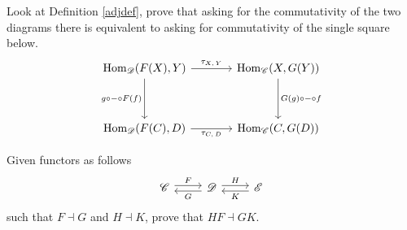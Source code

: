 \vspace*{0.1in}

\begin{problem}\label{prob 8.5}
Look at Definition \ref{adjdef}, prove that asking for the commutativity of the two diagrams there is equivalent to asking for commutativity of the single square below.
\[\begin{tikzcd}[row sep=huge, column sep=large]
{\mathrm{Hom}_{\cat{D}}(F(X),Y)} \arrow[r, "\tau_{X,\,Y}"]   \arrow[d, "g\circ -\circ F(f)"']                       & {\mathrm{Hom}_{\cat{C}}(X,G(Y))} \arrow[d, "G(g)\circ -\circ f"]                      \\
{\mathrm{Hom}_{\cat{D}}(F(C),D)} \arrow[r, "\tau_{C,\,D}"'] & {\mathrm{Hom}_{\cat{C}}(C,G(D))} 
\end{tikzcd}\]
\end{problem}

\vspace*{0.1in}

\begin{problem}\label{prob 8.6}
Given functors as follows
\[\begin{tikzcd}
\cat{C} \arrow[r, "F", shift left] & \cat{D} \arrow[r, "H", shift left] \arrow[l, "G", shift left] & \cat{E} \arrow[l, "K", shift left]
\end{tikzcd}\]
such that $F\dashv G$ and $H\dashv K$, prove that $HF \dashv GK$.
\end{problem}